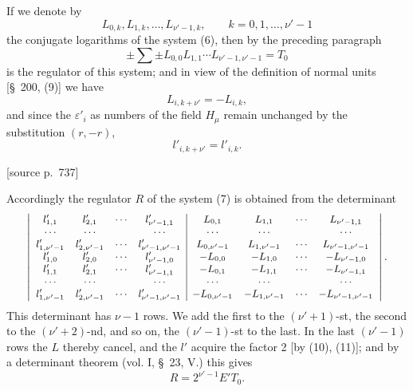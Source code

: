 \documentclass[11pt]{article}
\newcommand{\srcpage}[1]{\par\medskip\noindent\textsf{[source p.~#1]}\par\smallskip}
\begin{document}
If we denote by
\begin{equation}
L_{0,k},L_{1,k},\ldots,L_{\nu'-1,k},\qquad k=0,1,\ldots,\nu'-1
\tag{8}
\end{equation}
the conjugate logarithms of the system (6), then by the preceding paragraph
\begin{equation}
\pm\sum\pm L_{0,0}L_{1,1}\cdots L_{\nu'-1,\nu'-1}=T_0
\tag{9}
\end{equation}
is the regulator of this system; and in view of the definition of normal units [\S~200, (9)] we have
\begin{equation}
L_{i,k+\nu'}=-L_{i,k},
\tag{10}
\end{equation}
and since the $\varepsilon'_i$ as numbers of the field $H_\mu$ remain unchanged by the substitution $(r,-r)$,
\begin{equation}
l'_{i,k+\nu'}=l'_{i,k}.
\tag{11}
\end{equation}

\srcpage{737}
Accordingly the regulator $R$ of the system (7) is obtained from the determinant
\[
\small
\left|\begin{array}{cccc|cccc}
l'_{1,1}&l'_{2,1}&\cdots&l'_{\nu'-1,1}&L_{0,1}&L_{1,1}&\cdots&L_{\nu'-1,1}\\
\cdots&\cdots&&\cdots&\cdots&\cdots&&\cdots\\
l'_{1,\nu'-1}&l'_{2,\nu'-1}&\cdots&l'_{\nu'-1,\nu'-1}&L_{0,\nu'-1}&L_{1,\nu'-1}&\cdots&L_{\nu'-1,\nu'-1}\\
l'_{1,0}&l'_{2,0}&\cdots&l'_{\nu'-1,0}&-L_{0,0}&-L_{1,0}&\cdots&-L_{\nu'-1,0}\\
l'_{1,1}&l'_{2,1}&\cdots&l'_{\nu'-1,1}&-L_{0,1}&-L_{1,1}&\cdots&-L_{\nu'-1,1}\\
\cdots&\cdots&&\cdots&\cdots&\cdots&&\cdots\\
l'_{1,\nu'-1}&l'_{2,\nu'-1}&\cdots&l'_{\nu'-1,\nu'-1}&-L_{0,\nu'-1}&-L_{1,\nu'-1}&\cdots&-L_{\nu'-1,\nu'-1}
\end{array}\right|.
\]
This determinant has $\nu-1$ rows. We add the first to the $(\nu'+1)$-st, the second to the $(\nu'+2)$-nd, and so on, the $(\nu'-1)$-st to the last. In the last $(\nu'-1)$ rows the $L$ thereby cancel, and the $l'$ acquire the factor 2 [by (10), (11)]; and by a determinant theorem (vol. I, \S~23, V.) this gives
\begin{equation}
R=2^{\nu'-1}E'T_0.
\tag{12}
\end{equation}
\end{document}
